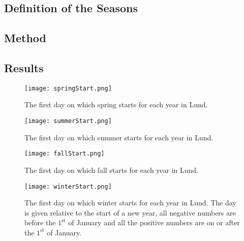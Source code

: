

\subsection{Definition of the Seasons}

\subsection{Method}

\subsection{Results}

\begin{figure}[h!]
\centering
\texttt{[image: springStart.png]}
\vspace{-10pt}
\caption{The first day on which spring starts for each year in Lund.} 
\label{fig:spring}
\end{figure}

\begin{figure}[h!]
\centering
\texttt{[image: summerStart.png]}
\vspace{-10pt}
\caption{The first day on which summer starts for each year in Lund.} 
\label{fig:summer}
\end{figure}

\begin{figure}[h!]
\centering
\texttt{[image: fallStart.png]}
\vspace{-10pt}
\caption{The first day on which fall starts for each year in Lund.} 
\label{fig:fall}
\end{figure}

\begin{figure}[h!]
\centering
\texttt{[image: winterStart.png]}
\vspace{-10pt}
\caption{The first day on which winter starts for each year in Lund. The day is given relative to the start of a new year, all negative numbers are before the $1^{\text{st}}$ of January and all the positive numbers are on or after the $1^\text{st}$ of January.}
\label{fig:winter}
\end{figure}



